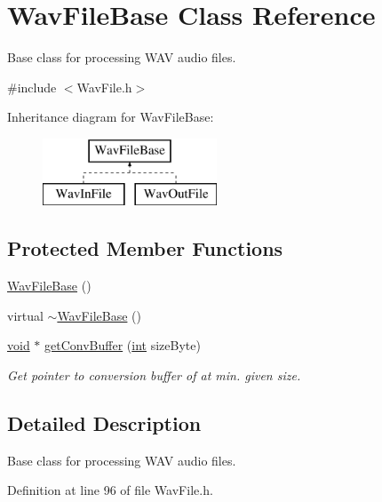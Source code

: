 \hypertarget{class_wav_file_base}{}\section{Wav\+File\+Base Class Reference}
\label{class_wav_file_base}


Base class for processing W\+AV audio files.  




{\ttfamily \#include $<$Wav\+File.\+h$>$}

Inheritance diagram for Wav\+File\+Base\+:\begin{figure}[H]
\begin{center}
\leavevmode
\includegraphics[height=2.000000cm]{class_wav_file_base}
\end{center}
\end{figure}
\subsection*{Protected Member Functions}
\begin{DoxyCompactItemize}
\item 
\hyperlink{class_wav_file_base_afc2f747605eca31a1edb4ddd3967eb34}{Wav\+File\+Base} ()
\item 
virtual \hyperlink{class_wav_file_base_ac0d843749d069b7f9f46233ec372ba51}{$\sim$\+Wav\+File\+Base} ()
\item 
\hyperlink{sound_8c_ae35f5844602719cf66324f4de2a658b3}{void} $\ast$ \hyperlink{class_wav_file_base_a2bf342b98b75c1012918f8f2f6f6e951}{get\+Conv\+Buffer} (\hyperlink{xmltok_8h_a5a0d4a5641ce434f1d23533f2b2e6653}{int} size\+Byte)
\begin{DoxyCompactList}\small\item\em Get pointer to conversion buffer of at min. given size. \end{DoxyCompactList}\end{DoxyCompactItemize}


\subsection{Detailed Description}
Base class for processing W\+AV audio files. 

Definition at line 96 of file Wav\+File.\+h.



